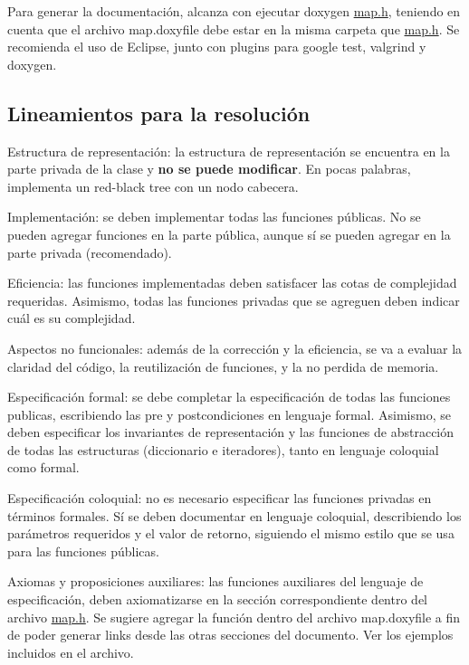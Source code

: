 Para generar la documentación, alcanza con ejecutar {\ttfamily doxygen \hyperlink{map_8h}{map.\+h}}, teniendo en cuenta que el archivo {\ttfamily map.\+doxyfile} debe estar en la misma carpeta que {\ttfamily \hyperlink{map_8h}{map.\+h}}. Se recomienda el uso de Eclipse, junto con plugins para {\ttfamily google test}, {\ttfamily valgrind} y {\ttfamily doxygen}.\hypertarget{Enunciado_enun-lineamiento}{}\subsection{Lineamientos para la resolución}\label{Enunciado_enun-lineamiento}

\begin{DoxyItemize}
\item Estructura de representación\+: la estructura de representación se encuentra en la parte privada de la clase y {\bfseries no se puede modificar}. En pocas palabras, implementa un red-\/black tree con un nodo cabecera.
\item Implementación\+: se deben implementar todas las funciones públicas. No se pueden agregar funciones en la parte pública, aunque sí se pueden agregar en la parte privada (recomendado).
\item Eficiencia\+: las funciones implementadas deben satisfacer las cotas de complejidad requeridas. Asimismo, todas las funciones privadas que se agreguen deben indicar cuál es su complejidad.
\item Aspectos no funcionales\+: además de la corrección y la eficiencia, se va a evaluar la claridad del código, la reutilización de funciones, y la no perdida de memoria.
\item Especificación formal\+: se debe completar la especificación de todas las funciones publicas, escribiendo las pre y postcondiciones en lenguaje formal. Asimismo, se deben especificar los invariantes de representación y las funciones de abstracción de todas las estructuras (diccionario e iteradores), tanto en lenguaje coloquial como formal.
\item Especificación coloquial\+: no es necesario especificar las funciones privadas en términos formales. Sí se deben documentar en lenguaje coloquial, describiendo los parámetros requeridos y el valor de retorno, siguiendo el mismo estilo que se usa para las funciones públicas.
\item Axiomas y proposiciones auxiliares\+: las funciones auxiliares del lenguaje de especificación, deben axiomatizarse en la sección correspondiente dentro del archivo {\ttfamily \hyperlink{map_8h}{map.\+h}}. Se sugiere agregar la función dentro del archivo {\ttfamily map.\+doxyfile} a fin de poder generar links desde las otras secciones del documento. Ver los ejemplos incluidos en el archivo.

\end{DoxyItemize}
